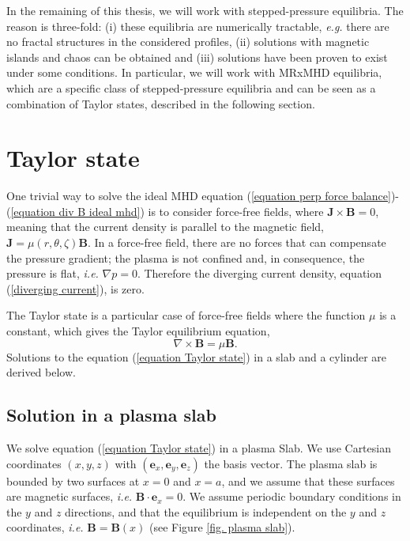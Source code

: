 \documentclass[my_thesis.tex]{subfiles}
\begin{document}
In the remaining of this thesis, we will work with stepped-pressure equilibria. The reason is three-fold: (i) these equilibria are numerically tractable, \textit{e.g.} there are no fractal structures in the considered profiles, (ii) solutions with magnetic islands and chaos can be obtained and (iii) solutions have been proven to exist under some conditions. In particular, we will work with \ac{MRxMHD} equilibria, which are a specific class of stepped-pressure equilibria and can be seen as a combination of Taylor states, described in the following section.



\section{Taylor state}
\label{section taylor state}
One trivial way to solve the ideal MHD equation (\ref{equation perp force balance})-(\ref{equation div B ideal mhd}) is to consider force-free fields, where $\mathbf{J}\times\mathbf{B}=0$, meaning that the current density is parallel to the magnetic field, $\mathbf{J}=\mu(r,\theta,\zeta)\mathbf{B}$. In a force-free field, there are no forces that can compensate the pressure gradient; the plasma is not confined and, in consequence, the pressure is flat, \textit{i.e.} $\nabla p=0$. Therefore the diverging current density, equation (\ref{diverging current}), is zero. 

The Taylor state \citep{Taylor1974,Taylor1986} is a particular case of force-free fields where the function $\mu$ is a constant, which gives the Taylor equilibrium equation,
\begin{equation}
	\nabla\times\mathbf{B}=\mu\mathbf{B}. \label{equation Taylor state}
\end{equation}
Solutions to the equation (\ref{equation Taylor state}) in a slab and a cylinder are derived below.

\subsection{Solution in a plasma slab}
We solve equation (\ref{equation Taylor state}) in a plasma Slab. We use Cartesian coordinates $(x,y,z)$ with $(\mathbf{e}_x,\mathbf{e}_y,\mathbf{e}_z)$ the basis vector. The plasma slab is bounded by two surfaces at $x=0$ and $x=a$, and we assume that these surfaces are magnetic surfaces, \textit{i.e.} $\mathbf{B}\cdot\mathbf{e}_x=0$. We assume periodic boundary conditions in the $y$ and $z$ directions, and that the equilibrium is independent on the $y$ and $z$ coordinates, \textit{i.e.} $\mathbf{B}=\mathbf{B}(x)$ (see Figure \ref{fig. plasma slab}).
\end{document}
